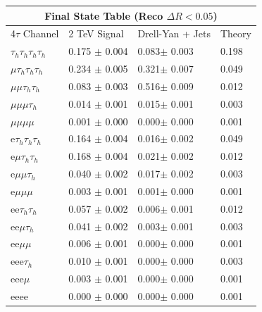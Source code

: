 \documentclass{article}
\begin{document}
 
\begin{landscape} 
\centering 
\begin{tabular}{|p{4.5cm}|p{3cm}|p{3cm}|p{3cm}|}\hline 
\multicolumn{4}{|c|}{Final State Table (Reco \(\Delta R < 0.05\))} \\ 
\hline 
4$\tau$ Channel & 2 TeV Signal & Drell-Yan + Jets & Theory \\ 
\hline 
$\tau_h$$\tau_h$$\tau_h$$\tau_h$ & 0.175 $\pm$ 0.004 & 0.083$\pm$ 0.003 & 0.198\\
\hline 
$\mu$$\tau_h$$\tau_h$$\tau_h$ & 0.234 $\pm$ 0.005 & 0.321$\pm$ 0.007 & 0.049\\
\hline 
$\mu$$\mu$$\tau_h$$\tau_h$ & 0.083 $\pm$ 0.003 & 0.516$\pm$ 0.009 & 0.012\\
\hline 
$\mu$$\mu$$\mu$$\tau_h$ & 0.014 $\pm$ 0.001 & 0.015$\pm$ 0.001 & 0.003\\
\hline 
$\mu$$\mu$$\mu$$\mu$ & 0.001 $\pm$ 0.000 & 0.000$\pm$ 0.000 & 0.001\\
\hline 
e$\tau_h$$\tau_h$$\tau_h$ & 0.164 $\pm$ 0.004 & 0.016$\pm$ 0.002 & 0.049\\
\hline 
e$\mu$$\tau_h$$\tau_h$ & 0.168 $\pm$ 0.004 & 0.021$\pm$ 0.002 & 0.012\\
\hline 
e$\mu$$\mu$$\tau_h$ & 0.040 $\pm$ 0.002 & 0.017$\pm$ 0.002 & 0.003\\
\hline 
e$\mu$$\mu$$\mu$ & 0.003 $\pm$ 0.001 & 0.001$\pm$ 0.000 & 0.001\\
\hline 
ee$\tau_h$$\tau_h$ & 0.057 $\pm$ 0.002 & 0.006$\pm$ 0.001 & 0.012\\
\hline 
ee$\mu$$\tau_h$ & 0.041 $\pm$ 0.002 & 0.003$\pm$ 0.001 & 0.003\\
\hline 
ee$\mu$$\mu$ & 0.006 $\pm$ 0.001 & 0.000$\pm$ 0.000 & 0.001\\
\hline 
eee$\tau_h$ & 0.010 $\pm$ 0.001 & 0.000$\pm$ 0.000 & 0.003\\
\hline 
eee$\mu$ & 0.003 $\pm$ 0.001 & 0.000$\pm$ 0.000 & 0.001\\
\hline 
eeee & 0.000 $\pm$ 0.000 & 0.000$\pm$ 0.000 & 0.001\\
\hline 
\end{tabular} 
\end{landscape} 
\end{document}
